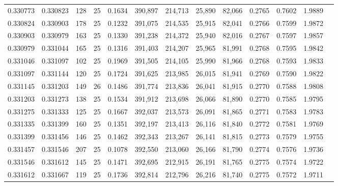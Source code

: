 \begin{tabular}{rrrrrrrrrrrrr}
0.330773 & 0.330823 &   128 &  25 &                                     0.1634 & 390,897 & 214,713 &  25,890 &  82,066 & 0.2765 & 0.7602 & 1.9889 \\
0.330824 & 0.330903 &   178 &  25 &                                     0.1232 & 391,075 & 214,535 &  25,915 &  82,041 & 0.2766 & 0.7599 & 1.9872 \\
0.330903 & 0.330979 &   163 &  25 &                                     0.1330 & 391,238 & 214,372 &  25,940 &  82,016 & 0.2767 & 0.7597 & 1.9857 \\
0.330979 & 0.331044 &   165 &  25 &                                     0.1316 & 391,403 & 214,207 &  25,965 &  81,991 & 0.2768 & 0.7595 & 1.9842 \\
0.331046 & 0.331097 &   102 &  25 &                                     0.1969 & 391,505 & 214,105 &  25,990 &  81,966 & 0.2768 & 0.7593 & 1.9833 \\
0.331097 & 0.331144 &   120 &  25 &                                     0.1724 & 391,625 & 213,985 &  26,015 &  81,941 & 0.2769 & 0.7590 & 1.9822 \\
0.331145 & 0.331203 &   149 &  26 &                                     0.1486 & 391,774 & 213,836 &  26,041 &  81,915 & 0.2770 & 0.7588 & 1.9808 \\
0.331203 & 0.331273 &   138 &  25 &                                     0.1534 & 391,912 & 213,698 &  26,066 &  81,890 & 0.2770 & 0.7585 & 1.9795 \\
0.331275 & 0.331333 &   125 &  25 &                                     0.1667 & 392,037 & 213,573 &  26,091 &  81,865 & 0.2771 & 0.7583 & 1.9783 \\
0.331335 & 0.331399 &   160 &  25 &                                     0.1351 & 392,197 & 213,413 &  26,116 &  81,840 & 0.2772 & 0.7581 & 1.9769 \\
0.331399 & 0.331456 &   146 &  25 &                                     0.1462 & 392,343 & 213,267 &  26,141 &  81,815 & 0.2773 & 0.7579 & 1.9755 \\
0.331457 & 0.331546 &   207 &  25 &                                     0.1078 & 392,550 & 213,060 &  26,166 &  81,790 & 0.2774 & 0.7576 & 1.9736 \\
0.331546 & 0.331612 &   145 &  25 &                                     0.1471 & 392,695 & 212,915 &  26,191 &  81,765 & 0.2775 & 0.7574 & 1.9722 \\
0.331612 & 0.331667 &   119 &  25 &                                     0.1736 & 392,814 & 212,796 &  26,216 &  81,740 & 0.2775 & 0.7572 & 1.9711 \\

\end{tabular}
